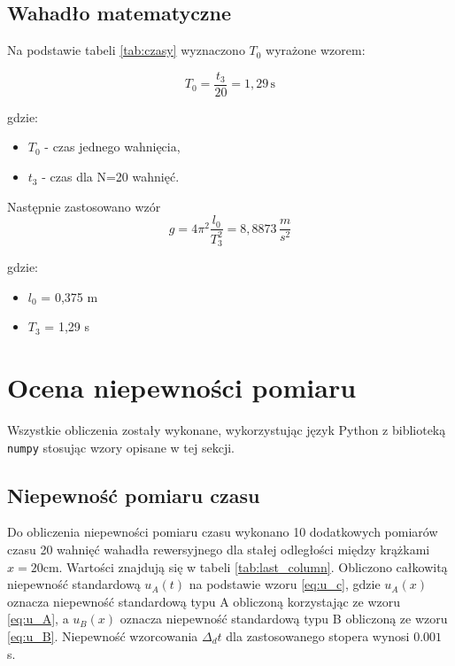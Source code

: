 \documentclass[a4paper,12pt]{article}
\begin{document}
\subsection{Wahadło matematyczne}
Na podstawie tabeli \ref{tab:czasy} wyznaczono $T_0$ wyrażone wzorem:\par
\begin{equation}
  T_0=\frac{t_3}{20}=1,29\,\text{s}
\end{equation} \par
gdzie:
\begin{itemize}
  \item \( T_0 \) - czas jednego wahnięcia,
  \item \( t_3 \) - czas dla N=20 wahnięć.
\end{itemize}\par
Następnie zastosowano wzór
\begin{equation}
  g=4\pi^2\frac{l_0}{T_3^2}=8,8873\,\frac{m}{s^2}
\end{equation} \par
gdzie:
\begin{itemize}
  \item \( l_0 \) = 0,375 m
  \item \( T_3 \) = 1,29 s
\end{itemize}\par

\section{Ocena niepewności pomiaru}

Wszystkie obliczenia zostały wykonane, wykorzystując język Python z biblioteką \texttt{numpy} stosując wzory opisane w tej sekcji.

\subsection{Niepewność pomiaru czasu}

Do obliczenia niepewności pomiaru czasu wykonano 10 dodatkowych pomiarów czasu 20 wahnięć wahadła rewersyjnego dla stałej odległości między krążkami $x=20 \text{cm}$. Wartości znajdują się w tabeli \ref{tab:last_column}. Obliczono całkowitą niepewność standardową $u_A(t)$ na podstawie wzoru \ref{eq:u_c}, gdzie $u_A(x)$ oznacza niepewność standardową typu A obliczoną korzystając ze wzoru \ref{eq:u_A}, a $u_B(x)$ oznacza niepewność standardową typu B obliczoną ze wzoru \ref{eq:u_B}. Niepewność wzorcowania $\Delta_d t$ dla zastosowanego stopera wynosi $0.001$ s.
\end{document}
